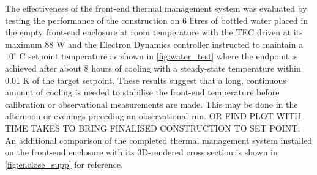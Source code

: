 The effectiveness of the front-end thermal management system was evaluated by testing the performance of the construction on 6 litres of bottled water placed in the empty front-end enclosure at room temperature with the TEC driven at its maximum 88 W and the Electron Dynamics controller instructed to maintain a $10^\circ$ C setpoint temperature as shown in \cref{fig:water_test} where the endpoint is achieved after about 8 hours of cooling with a steady-state temperature within 0.01 K of the target setpoint. These results suggest that a long, continuous amount of cooling is needed to stabilise the front-end temperature before calibration or observational measurements are made. This may be done in the afternoon or evenings preceding an observational run. OR FIND PLOT WITH TIME TAKES TO BRING FINALISED CONSTRUCTION TO SET POINT. An additional comparison of the completed thermal management system installed on the front-end enclosure with its 3D-rendered cross section is shown in \cref{fig:enclose_supp} for reference.
